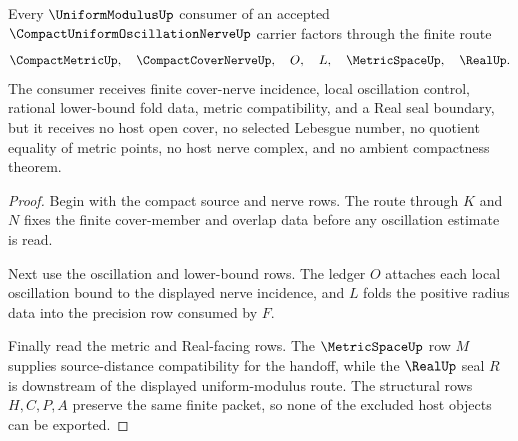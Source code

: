 \begin{theorem}
\label{thm:compact-uniform-oscillation-nerve-handoff}
Every $\UniformModulusUp$ consumer of an accepted $\CompactUniformOscillationNerveUp$ carrier factors through the finite route
$$
\CompactMetricUp,\quad \CompactCoverNerveUp,\quad O,\quad L,\quad \MetricSpaceUp,\quad \RealUp .
$$
The consumer receives finite cover-nerve incidence, local oscillation control, rational lower-bound fold data, metric compatibility, and a Real seal boundary, but it receives no host open cover, no selected Lebesgue number, no quotient equality of metric points, no host nerve complex, and no ambient compactness theorem.
\end{theorem}
\begin{proof}
Begin with the compact source and nerve rows. The route through $K$ and $N$ fixes the finite cover-member and overlap data before any oscillation estimate is read.

Next use the oscillation and lower-bound rows. The ledger $O$ attaches each local oscillation bound to the displayed nerve incidence, and $L$ folds the positive radius data into the precision row consumed by $F$.

Finally read the metric and Real-facing rows. The $\MetricSpaceUp$ row $M$ supplies source-distance compatibility for the handoff, while the $\RealUp$ seal $R$ is downstream of the displayed uniform-modulus route. The structural rows $H,C,P,A$ preserve the same finite packet, so none of the excluded host objects can be exported.
\end{proof}




